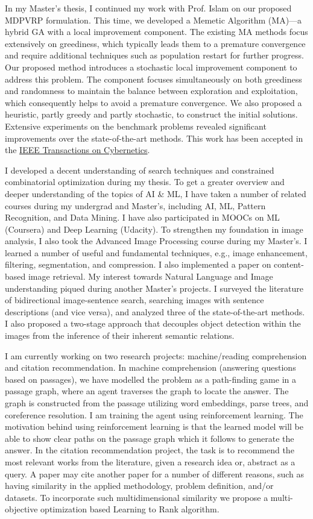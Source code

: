 \documentclass[12pt]{article}
\begin{document}
In my Master's thesis, I continued my work with Prof. Islam on our proposed MDPVRP formulation. This time, we developed a Memetic Algorithm (MA)---a hybrid GA with a local improvement component. The existing MA methods focus extensively on greediness, which typically leads them to a premature convergence and require additional techniques such as population restart for further progress. Our proposed method introduces a stochastic local improvement component to address this problem. The component focuses simultaneously on both greediness and randomness to maintain the balance between exploration and exploitation, which consequently helps to avoid a premature convergence. We also proposed a heuristic, partly greedy and partly stochastic, to construct the initial solutions. Extensive experiments on the benchmark problems revealed significant improvements over the state-of-the-art methods. This work has been accepted in the \href{http://ieeexplore.ieee.org/document/7835722/}{IEEE Transactions on Cybernetics}. 

I developed a decent understanding of search techniques and constrained combinatorial optimization during my thesis. To get a greater overview and deeper understanding of the topics of AI \& ML, I have taken a number of related courses during my undergrad and Master's, including AI, ML, Pattern Recognition, and Data Mining. I have also participated in MOOCs on ML (Coursera) and Deep Learning (Udacity). To strengthen my foundation in image analysis, I also took the Advanced Image Processing course during my Master's. I learned a number of useful and fundamental techniques, e.g., image enhancement, filtering, segmentation, and compression. I also implemented a paper on content-based image retrieval. My interest towards Natural Language and Image understanding piqued during another Master's projects. I surveyed the literature of bidirectional image-sentence search, searching images with sentence descriptions (and vice versa), and analyzed three of the state-of-the-art methods. I also proposed a two-stage approach that decouples object detection within the images from the inference of their inherent semantic relations. 

I am currently working on two research projects: machine/reading comprehension and citation recommendation. In machine comprehension (answering questions based on passages), we have modelled the problem as a path-finding game in a passage graph, where an agent traverses the graph to locate the answer. The graph is constructed from the passage utilizing word embeddings, parse trees, and coreference resolution. I am training the agent using reinforcement learning. The motivation behind using reinforcement learning is that the learned model will be able to show clear paths on the passage graph which it follows to generate the answer. In the citation recommendation project, the task is to recommend the most relevant works from the literature, given a research idea or, abstract as a query. A paper may cite another paper for a number of different reasons, such as having similarity in the applied methodology, problem definition, and/or datasets. To incorporate such multidimensional similarity we propose a multi-objective optimization based Learning to Rank algorithm. 
\end{document}
